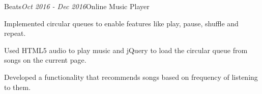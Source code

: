\begin{rSubsection}{Beats}{\em Oct 2016 - Dec 2016}{Online Music Player}{}
    \item Implemented circular queues to enable features like play, pause, shuffle and repeat.
    \item Used HTML5 audio to play music and jQuery to load the circular queue from songs on the current page.
    \item Developed a functionality that recommends songs based on frequency of listening to them.
\end{rSubsection}